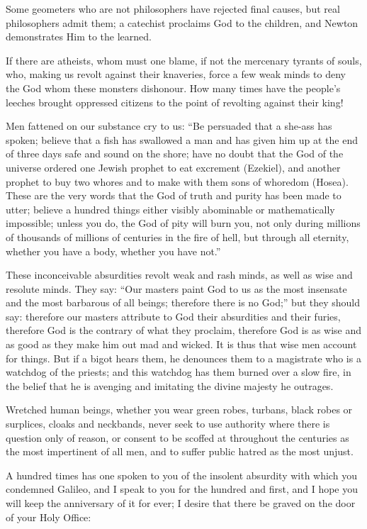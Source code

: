 Some geometers who are not philosophers have rejected final causes, but
real philosophers admit them; a catechist proclaims God to the children,
and Newton demonstrates Him to the learned.

If there are atheists, whom must one blame, if not the mercenary tyrants
of souls, who, making us revolt against their knaveries, force a few
weak minds to deny the God whom these monsters dishonour. How many times
have the people's leeches brought oppressed citizens to the point of
revolting against their king!

Men fattened on our substance cry to us: \enquote{Be persuaded that a she-ass
has spoken; believe that a fish has swallowed a man and has given him up
at the end of three days safe and sound on the shore; have no doubt that
the God of the universe ordered one Jewish prophet to eat excrement
(Ezekiel), and another prophet to buy two whores and to make with them
sons of whoredom (Hosea). These are the very words that the God of truth
and purity has been made to utter; believe a hundred things either
visibly abominable or mathematically impossible; unless you do, the God
of pity will burn you, not only during millions of thousands of millions
of centuries in the fire of hell, but through all eternity, whether you
have a body, whether you have not.}

These inconceivable absurdities revolt weak and rash minds, as well as
wise and resolute minds. They say: \enquote{Our masters paint God to us as the
most insensate and the most barbarous of all beings; therefore there is
no God;} but they should say: therefore our masters attribute to God
their absurdities and their furies, therefore God is the contrary of
what they proclaim, therefore God is as wise and as good as they make
him out mad and wicked. It is thus that wise men account for things. But
if a bigot hears them, he denounces them to a magistrate who is a
watchdog of the priests; and this watchdog has them burned over a slow
fire, in the belief that he is avenging and imitating the divine majesty
he outrages.


Wretched human beings, whether you wear green robes, turbans, black
robes or surplices, cloaks and neckbands, never seek to use authority
where there is question only of reason, or consent to be scoffed at
throughout the centuries as the most impertinent of all men, and to
suffer public hatred as the most unjust.

A hundred times has one spoken to you of the insolent absurdity with
which you condemned Galileo, and I speak to you for the hundred and
first, and I hope you will keep the anniversary of it for ever; I desire
that there be graved on the door of your Holy Office:

